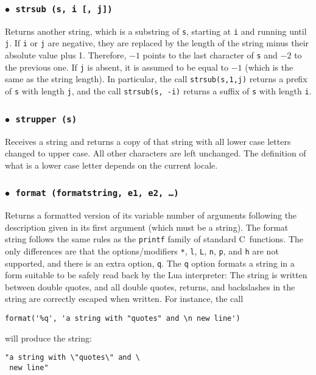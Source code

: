 \documentclass[11pt]{article}
\newcommand{\T}[1]{{\tt #1}}
\newcommand{\Math}[1]{$#1$}
\newcommand{\Deffunc}[1]{\index{#1}}
\newcommand{\ff}{$\bullet$\ }
\begin{document}
\subsubsection*{\ff \T{strsub (s, i [, j])}}\Deffunc{strsub}
Returns another string, which is a substring of \verb|s|,
starting at \verb|i|  and running until \verb|j|.
If \verb|i| or \verb|j| are negative,
they are replaced by the length of the string minus their
absolute value plus 1.
Therefore, \Math{-1} points to the last character of \verb|s|
and \Math{-2} to the previous one.
If \verb|j| is absent, it is assumed to be equal to \Math{-1}
(which is the same as the string length).
In particular,
the call \verb|strsub(s,1,j)| returns a prefix of \verb|s|
with length \verb|j|,
and the call \verb|strsub(s, -i)| returns a suffix of \verb|s|
with length \verb|i|.

\subsubsection*{\ff \T{strupper (s)}}\Deffunc{strupper}
Receives a string and returns a copy of that string with all
lower case letters changed to upper case.
All other characters are left unchanged.
The definition of what is a lower case
letter depends on the current locale.

\subsubsection*{\ff \T{format (formatstring, e1, e2, \ldots)}}\Deffunc{format}
\label{format}
Returns a formatted version of its variable number of arguments
following the description given in its first argument (which must be a string).
The format string follows the same rules as the \verb|printf| family of
standard C~functions.
The only differences are that the options/modifiers
\verb|*|, \verb|l|, \verb|L|, \verb|n|, \verb|p|,
and \verb|h| are not supported,
and there is an extra option, \verb|q|.
The \verb|q| option formats a string in a form suitable to be safely read
back by the Lua interpreter:
The string is written between double quotes,
and all double quotes, returns, and backslashes in the string
are correctly escaped when written.
For instance, the call
\begin{verbatim}
format('%q', 'a string with "quotes" and \n new line')
\end{verbatim}
will produce the string:
\begin{verbatim}
"a string with \"quotes\" and \
 new line"
\end{verbatim}
\end{document}
